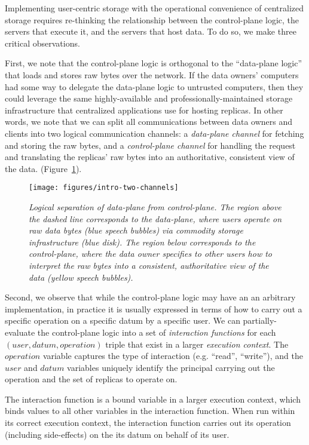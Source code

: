 Implementing user-centric storage with the operational convenience of centralized storage
requires re-thinking the relationship between the control-plane logic, the servers
that execute it, and the servers that host data.  To do so, we make three critical observations.

First, we note that the control-plane logic is
orthogonal to the ``data-plane logic'' that loads and stores raw bytes over the
network.  If the data owners' computers had some way to
delegate the data-plane logic to untrusted computers, then they could leverage
the same highly-available and professionally-maintained storage
infrastructure that centralized applications use for hosting replicas.
In other words, we note that we can split all communications between data owners
and clients into two logical communication channels: a
\emph{data-plane channel} for fetching and storing
the raw bytes, and a \emph{control-plane channel} 
for handling the request and translating the replicas'
raw bytes into an authoritative, consistent view of the data.
(Figure~\ref{fig:intro-two-channels}).


\begin{figure}[ht!]
   \centering
   \texttt{[image: figures/intro-two-channels]}
   \caption{\it Logical separation of data-plane from control-plane.
   The region above the dashed line corresponds to the data-plane, where users
   operate on raw data bytes (blue speech bubbles) via commodity storage
   infrastructure (blue disk).  The region below
   corresponds to the control-plane, where the data owner specifies to other
   users how to interpret the raw bytes into a consistent, authoritative view of
   the data (yellow speech bubbles).}
   \label{fig:intro-two-channels}
\end{figure}

Second, we observe that while the control-plane logic may have an
an arbitrary implementation, in practice it is usually expressed in terms
of how to carry out a specific operation on a specific datum by a
specific user.  We can partially-evaluate the control-plane logic into 
a set of \emph{interaction functions} for each $(user, datum, operation)$
triple that exist in a larger \emph{execution context}.
The $operation$ variable captures the type of interaction (e.g.
``read'', ``write''), and the $user$ and $datum$ variables uniquely identify the
principal carrying out the operation and the set of replicas to operate on.

The interaction function is a bound variable in a larger execution context,
which binds values to all other variables in the interaction function.
When run within its correct execution context,
the interaction function carries out its operation (including side-effects) on
the its datum on behalf of its user.

